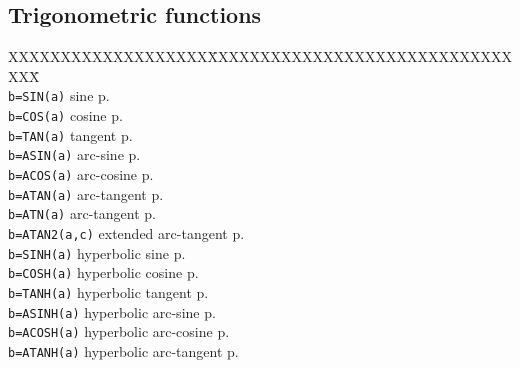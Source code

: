 \subsection{Trigonometric functions}
\begin{tabbing}
XXXXXXXXXXXXXXXXXXX\=XXXXXXXXXXXXXXXXXXXXXXXXXXXXXXXX\=\kill\\
\verb|b=SIN(a)|	\>     sine\> p.\pageref{SIN}\\
\verb|b=COS(a)|	\>     cosine\> p.\pageref{COS}\\
\verb|b=TAN(a)|	\>     tangent\> p.\pageref{TAN}\\

\verb|b=ASIN(a)|	\>arc-sine \> p.\pageref{ASIN}\\
\verb|b=ACOS(a)|	\>arc-cosine \> p.\pageref{ACOS}\\
\verb|b=ATAN(a)|	\>arc-tangent \> p.\pageref{ATAN}\\
\verb|b=ATN(a)|	\>arc-tangent \> p.\pageref{ATN}\\
\verb|b=ATAN2(a,c)|	\>extended arc-tangent \> p.\pageref{ATAN2}\\

\verb|b=SINH(a)|	\>hyperbolic sine \> p.\pageref{SINH}\\
\verb|b=COSH(a)|	\>hyperbolic cosine\> p.\pageref{COSH}\\
\verb|b=TANH(a)|	\>hyperbolic tangent\> p.\pageref{TANH}\\

\verb|b=ASINH(a)|	\>hyperbolic arc-sine\> p.\pageref{ASINH}\\
\verb|b=ACOSH(a)|	\>hyperbolic arc-cosine\> p.\pageref{ACOSH}\\
\verb|b=ATANH(a)|	\>hyperbolic arc-tangent\> p.\pageref{ATANH}\\
\end{tabbing}


